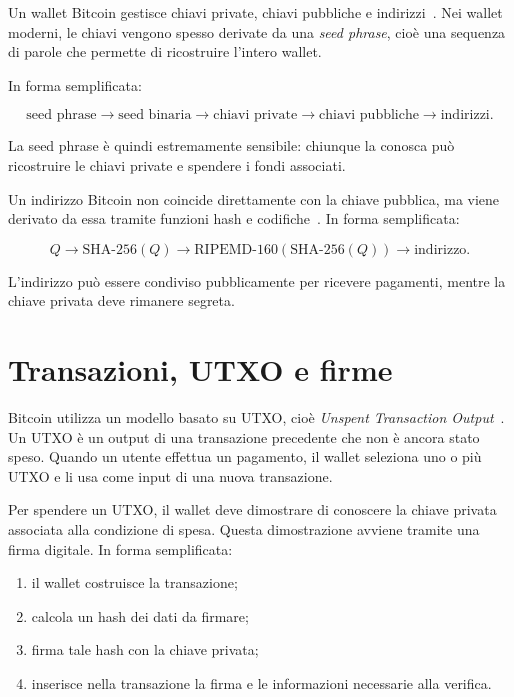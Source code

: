 \documentclass[12pt,a4paper,oneside]{report}
\begin{document}
Un wallet Bitcoin gestisce chiavi private, chiavi pubbliche e indirizzi~\cite{margara_bitcoin}. Nei wallet moderni, le chiavi vengono spesso derivate da una \textit{seed phrase}, cioè una sequenza di parole che permette di ricostruire l'intero wallet.

In forma semplificata:

\[
\text{seed phrase}
\longrightarrow
\text{seed binaria}
\longrightarrow
\text{chiavi private}
\longrightarrow
\text{chiavi pubbliche}
\longrightarrow
\text{indirizzi}.
\]

La seed phrase è quindi estremamente sensibile: chiunque la conosca può ricostruire le chiavi private e spendere i fondi associati.

Un indirizzo Bitcoin non coincide direttamente con la chiave pubblica, ma viene derivato da essa tramite funzioni hash e codifiche~\cite{margara_bitcoin}. In forma semplificata:

\[
Q
\longrightarrow
\mathrm{SHA\mbox{-}256}(Q)
\longrightarrow
\mathrm{RIPEMD\mbox{-}160}(\mathrm{SHA\mbox{-}256}(Q))
\longrightarrow
\text{indirizzo}.
\]

L'indirizzo può essere condiviso pubblicamente per ricevere pagamenti, mentre la chiave privata deve rimanere segreta.

\section{Transazioni, UTXO e firme}

Bitcoin utilizza un modello basato su UTXO, cioè \textit{Unspent Transaction Output}~\cite{margara_bitcoin}. Un UTXO è un output di una transazione precedente che non è ancora stato speso. Quando un utente effettua un pagamento, il wallet seleziona uno o più UTXO e li usa come input di una nuova transazione.

Per spendere un UTXO, il wallet deve dimostrare di conoscere la chiave privata associata alla condizione di spesa. Questa dimostrazione avviene tramite una firma digitale. In forma semplificata:

\begin{enumerate}
    \item il wallet costruisce la transazione;
    \item calcola un hash dei dati da firmare;
    \item firma tale hash con la chiave privata;
    \item inserisce nella transazione la firma e le informazioni necessarie alla verifica.
\end{enumerate}
\end{document}
